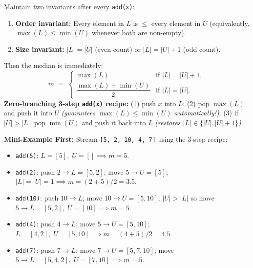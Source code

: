 \documentclass[11pt,a4paper]{article}
\theoremstyle{definition}
\newcommand{\examplebeat}{\textbf{\color{primaryblue}Mini-Example First:} }
\begin{document}
\begin{formulabox}
Maintain two invariants after every \texttt{add(x)}:
\begin{enumerate}[itemsep=1pt, topsep=2pt]
    \item \textbf{Order invariant:} Every element in $L$ is $\le$ every element in $U$ (equivalently, $\max(L) \le \min(U)$ whenever both are non-empty).
    \item \textbf{Size invariant:} $|L| = |U|$ (even count) or $|L| = |U| + 1$ (odd count).
\end{enumerate}
Then the median is immediately:
$$m \;=\; \begin{cases} \max(L) & \text{if } |L| = |U| + 1, \\[3pt] \dfrac{\max(L) + \min(U)}{2} & \text{if } |L| = |U|. \end{cases}$$
\textbf{Zero-branching 3-step \texttt{add(x)} recipe:} (1) push $x$ into $L$; (2) pop $\max(L)$ and push it into $U$ \emph{(guarantees $\max(L) \le \min(U)$ automatically!)}; (3) if $|U| > |L|$, pop $\min(U)$ and push it back into $L$ \emph{(restores $|L| \in \{|U|, |U|+1\}$)}.
\end{formulabox}

\examplebeat Stream \texttt{[5, 2, 10, 4, 7]} using the 3-step recipe:
\begin{itemize}[itemsep=1pt]
    \item \texttt{add(5)}: $L=[5],\; U=[] \implies m = 5$.
    \item \texttt{add(2)}: push $2 \to L=[5,2]$; move $5 \to U=[5]$; $|L|=|U|=1 \implies m = (2+5)/2 = 3.5$.
    \item \texttt{add(10)}: push $10 \to L$; move $10 \to U=[5,10]$; $|U|>|L|$ so move $5 \to L=[5,2],\; U=[10] \implies m = 5$.
    \item \texttt{add(4)}: push $4 \to L$; move $5 \to U=[5,10]$; $L=[4,2],\; U=[5,10] \implies m = (4+5)/2 = 4.5$.
    \item \texttt{add(7)}: push $7 \to L$; move $7 \to U=[5,7,10]$; move $5 \to L=[5,4,2],\; U=[7,10] \implies m = 5$.
\end{itemize}
\end{document}
